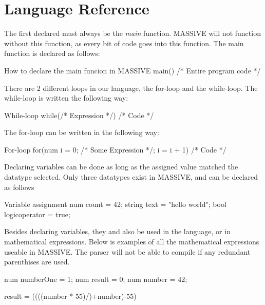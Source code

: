 \section{Language Reference}


The first declared must always be the \textit{main} function. MASSIVE will not function without this function, as every bit of code goes into this function.
The main function is declared as follows:

\begin{source}{How to declare the main funcion in MASSIVE}{}
main()
{
		/* Entire program code */
}
\end{source}

There are 2 different loops in our language, the for-loop and the while-loop. The while-loop is written the following way:
\begin{source}{While-loop}{}
while(/* Expression */)
{
		/* Code */
}
\end{source}

The for-loop can be written in the following way:
\begin{source}{For-loop}{}
for(num i = 0; /* Some Expression */; i = i + 1)
{
		/* Code */
}
\end{source}

Declaring variables can be done as long as the assigned value matched the datatype selected. Only three datatypes exist in MASSIVE, and can be declared as follows

\begin{source}{Variable assignment}{}
num count = 42;
string text = "hello world";
bool logicoperator = true;
\end{source}

Besides declaring variables, they and also be used in the language, or in mathematical expressions. Below is examples of all the mathematical expressions useable in MASSIVE. The parser will not be able to compile if any redundant parenthises are used.

\begin{source}{}{}

num numberOne = 1;
num result = 0;
num number = 42;

result = ((((number * 55)/)+number)-55)

\end{source}

